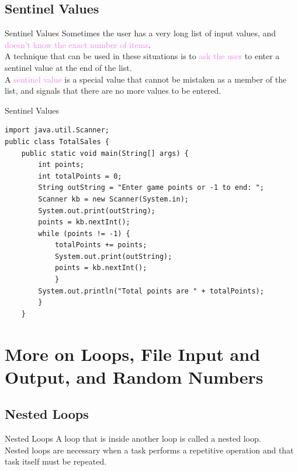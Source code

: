 \documentclass[11pt]{beamer}
\newcommand{\violet}[1]{\textcolor{violet}{#1}}
\begin{document}
\subsection{Sentinel Values}
\begin{frame}[fragile]{Sentinel Values}
    Sometimes the user has a very long list of input values, and \violet{doesn’t know the exact number of items}. \\ 
    \vspace{1em}
    A technique that can be used in these situations is to \violet{ask the user} to enter a sentinel value at the end of the list. \\ 
    \vspace{1em}
    A \violet{sentinel value} is a special value that cannot be mistaken as a member of the list, and signals that there are no more values to be entered.
\end{frame}

\begin{frame}[fragile]{Sentinel Values}
\begin{lstlisting}[basicstyle=\ttfamily\scriptsize]
import java.util.Scanner;
public class TotalSales {
    public static void main(String[] args) {
        int points;
        int totalPoints = 0;
        String outString = "Enter game points or -1 to end: ";
        Scanner kb = new Scanner(System.in);
        System.out.print(outString);
        points = kb.nextInt();
        while (points != -1) {
            totalPoints += points;
            System.out.print(outString);
            points = kb.nextInt();
            }
        System.out.println("Total points are " + totalPoints);
        }
    }
    \end{lstlisting}
\end{frame}

\section{More on Loops, File Input and Output, and Random Numbers}
\subsection{Nested Loops}
\begin{frame}{Nested Loops}
    A loop that is inside another loop is called a nested loop. \\ 
    \vspace{1em}
    Nested loops are necessary when a task performs a repetitive operation and that task itself must be repeated.    
\end{frame}
\end{document}

